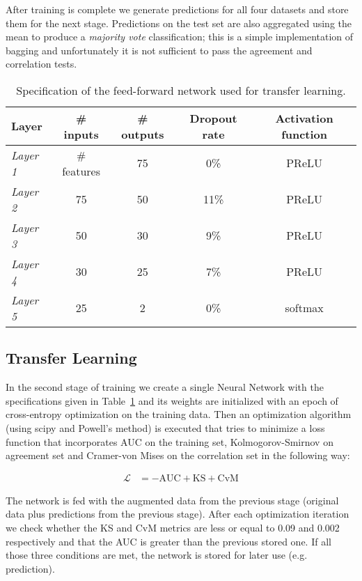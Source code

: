 \documentclass[conference]{IEEEtran}
\begin{document}
After training is complete we generate predictions for all four datasets and
store them for the next stage. Predictions on the test set are also aggregated
using the mean to produce a \textit{majority vote} classification; this is a
simple implementation of bagging and unfortunately it is not sufficient to pass
the agreement and correlation tests.

\begin{table} %
	\centering
	\begin{tabular}{ l c c c c }
		\textbf{Layer} & \textbf{\# inputs} & \textbf{\# outputs} &
			\textbf{Dropout rate} & \textbf{Activation function} \\ \hline
		\textit{Layer 1} & \# features & 75 & 0\% & PReLU \\
		\textit{Layer 2} & 75 & 50 & 11\% & PReLU \\
		\textit{Layer 3} & 50 & 30 & 9\% & PReLU \\
		\textit{Layer 4} & 30 & 25 & 7\% & PReLU \\
		\textit{Layer 5} & 25 & 2 & 0\% & softmax \\
	\end{tabular}
	\caption{Specification of the feed-forward network used for transfer
		learning.}
	\label{tab:model2}
\end{table}

\subsection{Transfer Learning}
In the second stage of training we create a single Neural Network with the
specifications given in Table~\ref{tab:model2} and its weights are initialized
with an epoch of cross-entropy optimization on the training data. Then an
optimization algorithm (using scipy and Powell's method) is executed that tries
to minimize a loss function that incorporates AUC on the training set,
Kolmogorov-Smirnov on agreement set and Cramer-von Mises on the correlation set
in the following way:

\begin{align}
	\mathcal{L} &= -\text{AUC} + \text{KS} + \text{CvM}
	\label{eqn:loss}
\end{align}

The network is fed with the augmented data from the previous stage (original
data plus predictions from the previous stage).  After each optimization
iteration we check whether the KS and CvM metrics are less or equal to 0.09 and
0.002 respectively and that the AUC is greater than the previous stored one. If
all those three conditions are met, the network is stored for later use (e.g.
prediction).
\end{document}
